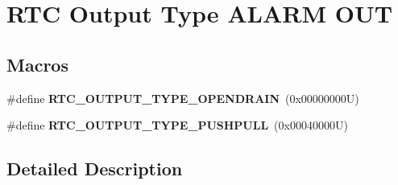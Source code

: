 \hypertarget{group___r_t_c___output___type___a_l_a_r_m___o_u_t}{}\section{R\+TC Output Type A\+L\+A\+RM O\+UT}
\label{group___r_t_c___output___type___a_l_a_r_m___o_u_t}
\subsection*{Macros}
\begin{DoxyCompactItemize}
\item 
\mbox{\label{group___r_t_c___output___type___a_l_a_r_m___o_u_t_gaa2505e0038154990024b533160bd46bd}} 
\#define {\bfseries R\+T\+C\+\_\+\+O\+U\+T\+P\+U\+T\+\_\+\+T\+Y\+P\+E\+\_\+\+O\+P\+E\+N\+D\+R\+A\+IN}~(0x00000000\+U)
\item 
\mbox{\label{group___r_t_c___output___type___a_l_a_r_m___o_u_t_ga3e0b4512d6531cb0bb428163d7bd927d}} 
\#define {\bfseries R\+T\+C\+\_\+\+O\+U\+T\+P\+U\+T\+\_\+\+T\+Y\+P\+E\+\_\+\+P\+U\+S\+H\+P\+U\+LL}~(0x00040000\+U)
\end{DoxyCompactItemize}


\subsection{Detailed Description}
